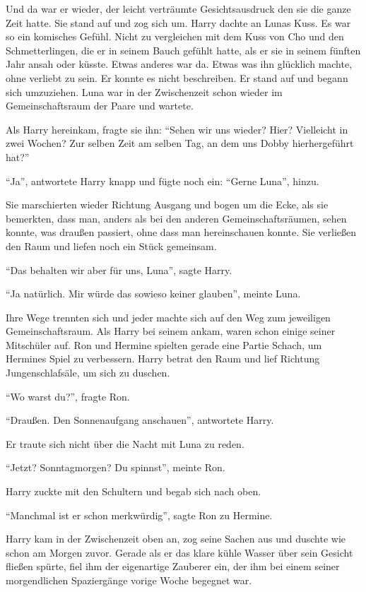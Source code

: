 Und da war er wieder, der leicht verträumte Gesichtsausdruck den sie die ganze Zeit hatte. Sie stand auf und zog sich um. Harry dachte an Lunas Kuss. Es war so ein komisches Gefühl. Nicht zu vergleichen mit dem Kuss von Cho und den Schmetterlingen, die er in seinem Bauch gefühlt hatte, als er sie in seinem fünften Jahr ansah oder küsste. Etwas anderes war da. Etwas was ihn glücklich machte, ohne verliebt zu sein. Er konnte es nicht beschreiben. Er stand auf und begann sich umzuziehen. Luna war in der Zwischenzeit schon wieder im Gemeinschaftsraum der Paare und wartete.

Als Harry hereinkam, fragte sie ihn: \enquote{Sehen wir uns wieder? Hier? Vielleicht in zwei Wochen? Zur selben Zeit am selben Tag, an dem uns Dobby hierhergeführt hat?}

\enquote{Ja}, antwortete Harry knapp und fügte noch ein: \enquote{Gerne Luna}, hinzu.

Sie marschierten wieder Richtung Ausgang und bogen um die Ecke, als sie bemerkten, dass man, anders als bei den anderen Gemeinschaftsräumen, sehen konnte, was draußen passiert, ohne dass man hereinschauen konnte. Sie verließen den Raum und liefen noch ein Stück gemeinsam.

\enquote{Das behalten wir aber für uns, Luna}, sagte Harry.

\enquote{Ja natürlich. Mir würde das sowieso keiner glauben}, meinte Luna.

Ihre Wege trennten sich und jeder machte sich auf den Weg zum jeweiligen Gemeinschaftsraum. Als Harry bei seinem ankam, waren schon einige seiner Mitschüler auf. Ron und Hermine spielten gerade eine Partie Schach, um Hermines Spiel zu verbessern. Harry betrat den Raum und lief Richtung Jungenschlafsäle, um sich zu duschen.

\enquote{Wo warst du?}, fragte Ron.

\enquote{Draußen. Den Sonnenaufgang anschauen}, antwortete Harry.

Er traute sich nicht über die Nacht mit Luna zu reden.

\enquote{Jetzt? Sonntagmorgen? Du spinnst}, meinte Ron.

Harry zuckte mit den Schultern und begab sich nach oben.

\enquote{Manchmal ist er schon merkwürdig}, sagte Ron zu Hermine.

Harry kam in der Zwischenzeit oben an, zog seine Sachen aus und duschte wie schon am Morgen zuvor. Gerade als er das klare kühle Wasser über sein Gesicht fließen spürte, fiel ihm der eigenartige Zauberer ein, der ihm bei einem seiner morgendlichen Spaziergänge vorige Woche begegnet war.


